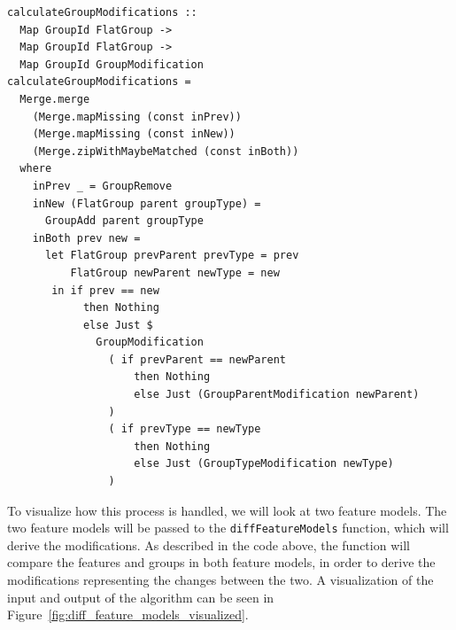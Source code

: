 \documentclass[a4paper,english]{ifimaster}
\begin{document}
\begin{verbatim}
calculateGroupModifications ::
  Map GroupId FlatGroup ->
  Map GroupId FlatGroup ->
  Map GroupId GroupModification
calculateGroupModifications =
  Merge.merge
    (Merge.mapMissing (const inPrev))
    (Merge.mapMissing (const inNew))
    (Merge.zipWithMaybeMatched (const inBoth))
  where
    inPrev _ = GroupRemove
    inNew (FlatGroup parent groupType) =
      GroupAdd parent groupType
    inBoth prev new =
      let FlatGroup prevParent prevType = prev
          FlatGroup newParent newType = new
       in if prev == new
            then Nothing
            else Just $
              GroupModification
                ( if prevParent == newParent
                    then Nothing
                    else Just (GroupParentModification newParent)
                )
                ( if prevType == newType
                    then Nothing
                    else Just (GroupTypeModification newType)
                )
\end{verbatim}

To visualize how this process is handled, we will look at two feature models. The two feature models will be passed to the \texttt{diff\-Feature\-Models} function, which will derive the modifications. As described in the code above, the function will compare the features and groups in both feature models, in order to derive the modifications representing the changes between the two. A visualization of the input and output of the algorithm can be seen in Figure~\ref{fig:diff_feature_models_visualized}.
\end{document}
